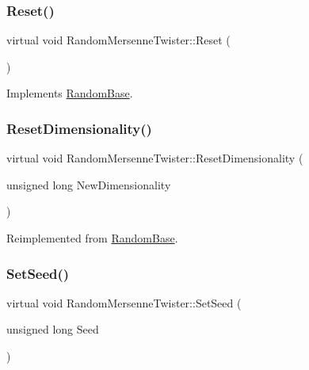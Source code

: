 \hypertarget{classRandomMersenneTwister_aac2add88779d014d7722a3bfe9eed219}{}\label{classRandomMersenneTwister_aac2add88779d014d7722a3bfe9eed219} 
\subsubsection{\texorpdfstring{Reset()}{Reset()}}
{\footnotesize\ttfamily virtual void Random\+Mersenne\+Twister\+::\+Reset (\begin{DoxyParamCaption}{ }\end{DoxyParamCaption})\hspace{0.3cm}{\ttfamily [virtual]}}



Implements \hyperlink{classRandomBase_a6e35c1467b37fc8c5e262297223685eb}{Random\+Base}.

\hypertarget{classRandomMersenneTwister_a5fdeed1a2eaabf7b61241b6f850cbaf1}{}\label{classRandomMersenneTwister_a5fdeed1a2eaabf7b61241b6f850cbaf1} 
\subsubsection{\texorpdfstring{Reset\+Dimensionality()}{ResetDimensionality()}}
{\footnotesize\ttfamily virtual void Random\+Mersenne\+Twister\+::\+Reset\+Dimensionality (\begin{DoxyParamCaption}\item[{unsigned long}]{New\+Dimensionality }\end{DoxyParamCaption})\hspace{0.3cm}{\ttfamily [virtual]}}



Reimplemented from \hyperlink{classRandomBase_a8931e429ae130ea44af5469dc6ae728f}{Random\+Base}.

\hypertarget{classRandomMersenneTwister_ac03508508fce508b21a53ce0739b061b}{}\label{classRandomMersenneTwister_ac03508508fce508b21a53ce0739b061b} 
\subsubsection{\texorpdfstring{Set\+Seed()}{SetSeed()}}
{\footnotesize\ttfamily virtual void Random\+Mersenne\+Twister\+::\+Set\+Seed (\begin{DoxyParamCaption}\item[{unsigned long}]{Seed }\end{DoxyParamCaption})\hspace{0.3cm}{\ttfamily [virtual]}}




